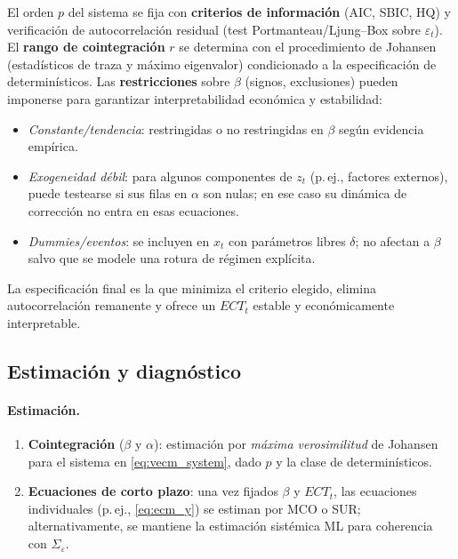 \documentclass[11pt,a4paper]{article}
\newcommand{\1}{\mathbf{1}}
\begin{document}
El orden $p$ del sistema se fija con \textbf{criterios de información} (AIC, SBIC, HQ) y verificación de autocorrelación residual (test Portmanteau/Ljung--Box sobre $\varepsilon_t$). El \textbf{rango de cointegración} $r$ se determina con el procedimiento de Johansen (estadísticos de traza y máximo eigenvalor) condicionado a la especificación de determinísticos. Las \textbf{restricciones} sobre $\beta$ (signos, exclusiones) pueden imponerse para garantizar interpretabilidad económica y estabilidad:
\begin{itemize}
  \item \emph{Constante/tendencia}: restringidas o no restringidas en $\beta$ según evidencia empírica.
  \item \emph{Exogeneidad débil}: para algunos componentes de $z_t$ (p.\,ej., factores externos), puede testearse si sus filas en $\alpha$ son nulas; en ese caso su dinámica de corrección no entra en esas ecuaciones.
  \item \emph{Dummies/eventos}: se incluyen en $x_t$ con parámetros libres $\delta$; no afectan a $\beta$ salvo que se modele una rotura de régimen explícita.
\end{itemize}
La especificación final es la que minimiza el criterio elegido, elimina autocorrelación remanente y ofrece un $ECT_t$ estable y económicamente interpretable.

\subsection{Estimación y diagnóstico}

\paragraph{Estimación.}
\begin{enumerate}
  \item \textbf{Cointegración} ($\beta$ y $\alpha$): estimación por \emph{máxima verosimilitud} de Johansen para el sistema en \eqref{eq:vecm_system}, dado $p$ y la clase de determinísticos.
  \item \textbf{Ecuaciones de corto plazo}: una vez fijados $\beta$ y $ECT_t$, las ecuaciones individuales (p.\,ej., \eqref{eq:ecm_y}) se estiman por MCO o SUR; alternativamente, se mantiene la estimación sistémica ML para coherencia con $\Sigma_\varepsilon$.
\end{enumerate}
\end{document}
